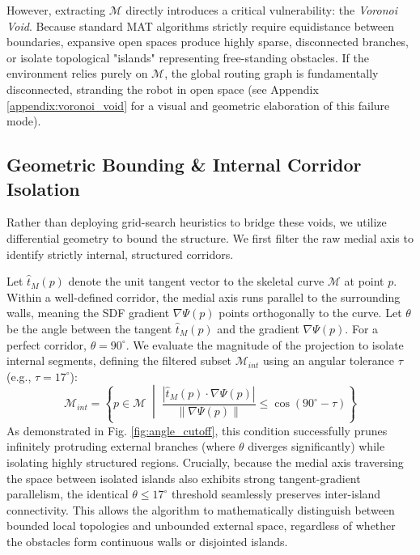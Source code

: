 \documentclass[letterpaper, 10 pt, conference]{IEEEtran}
\begin{document}
However, extracting $\mathcal{M}$ directly introduces a critical vulnerability: the \textit{Voronoi Void}. Because standard MAT algorithms strictly require equidistance between boundaries, expansive open spaces produce highly sparse, disconnected branches, or isolate topological "islands" representing free-standing obstacles. If the environment relies purely on $\mathcal{M}$, the global routing graph is fundamentally disconnected, stranding the robot in open space (see Appendix \ref{appendix:voronoi_void} for a visual and geometric elaboration of this failure mode).

\subsection{Geometric Bounding \& Internal Corridor Isolation}
Rather than deploying grid-search heuristics to bridge these voids, we utilize differential geometry to bound the structure. We first filter the raw medial axis to identify strictly internal, structured corridors. 

Let $\hat{t}_M(p)$ denote the unit tangent vector to the skeletal curve $\mathcal{M}$ at point $p$. Within a well-defined corridor, the medial axis runs parallel to the surrounding walls, meaning the SDF gradient $\nabla\Psi(p)$ points orthogonally to the curve. Let $\theta$ be the angle between the tangent $\hat{t}_M(p)$ and the gradient $\nabla\Psi(p)$. For a perfect corridor, $\theta = 90^\circ$. We evaluate the magnitude of the projection to isolate internal segments, defining the filtered subset $\mathcal{M}_{int}$ using an angular tolerance $\tau$ (e.g., $\tau = 17^\circ$):
\begin{equation}
    \mathcal{M}_{int} = \left\{ p \in \mathcal{M} \;\middle|\; \frac{|\hat{t}_M(p) \cdot \nabla\Psi(p)|}{\|\nabla\Psi(p)\|} \le \cos(90^\circ - \tau) \right\}
\end{equation}
As demonstrated in Fig. \ref{fig:angle_cutoff}, this condition successfully prunes infinitely protruding external branches (where $\theta$ diverges significantly) while isolating highly structured regions. Crucially, because the medial axis traversing the space between isolated islands also exhibits strong tangent-gradient parallelism, the identical $\theta \le 17^\circ$ threshold seamlessly preserves inter-island connectivity. This allows the algorithm to mathematically distinguish between bounded local topologies and unbounded external space, regardless of whether the obstacles form continuous walls or disjointed islands.
\end{document}
